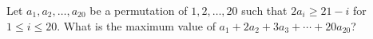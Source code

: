 Let $a_1,a_2,\dots,a_{20}$ be a permutation of $1,2,\dots,20$ such that $2a_i\ge21-i$ for $1\le i\le20$. What is the maximum value of $a_1+2a_2+3a_3+\cdots+20a_{20}$?
